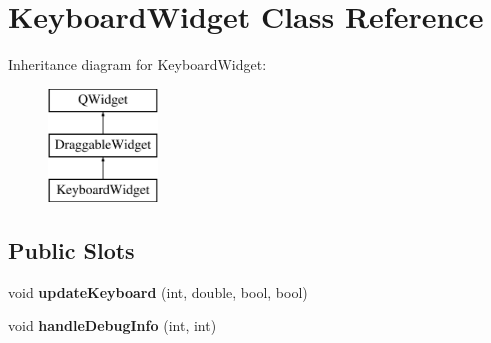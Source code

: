 \hypertarget{class_keyboard_widget}{\section{Keyboard\+Widget Class Reference}
\label{class_keyboard_widget}
}
Inheritance diagram for Keyboard\+Widget\+:\begin{figure}[H]
\begin{center}
\leavevmode
\includegraphics[height=3.000000cm]{class_keyboard_widget}
\end{center}
\end{figure}
\subsection*{Public Slots}
\begin{DoxyCompactItemize}
\item 
\hypertarget{class_keyboard_widget_a10b8c5634e33ed65194ecab8fc066143}{void {\bfseries update\+Keyboard} (int, double, bool, bool)}\label{class_keyboard_widget_a10b8c5634e33ed65194ecab8fc066143}

\item 
\hypertarget{class_keyboard_widget_a673562ad25f4b0f2c660cebf631ba57a}{void {\bfseries handle\+Debug\+Info} (int, int)}\label{class_keyboard_widget_a673562ad25f4b0f2c660cebf631ba57a}

\end{DoxyCompactItemize}
